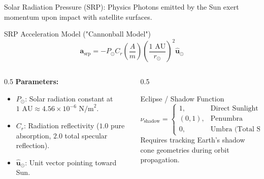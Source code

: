 \documentclass[aspectratio=169,11pt]{beamer}
\begin{document}
\begin{frame}{Solar Radiation Pressure (SRP): Physics}
    Photons emitted by the Sun exert momentum upon impact with satellite surfaces.

    \begin{block}{SRP Acceleration Model ("Cannonball Model")}
        $$\mathbf{a}_{\text{srp}} = - P_{\odot} C_r \left(\frac{A}{m}\right) \left(\frac{1 \text{ AU}}{r_{\odot}}\right)^2 \hat{\mathbf{u}}_{\odot}$$
    \end{block}

    \begin{columns}
        \begin{column}{0.5\textwidth}
            \textbf{Parameters:}
            \begin{itemize}
                \item $P_{\odot}$: Solar radiation constant at $1\text{ AU} \approx 4.56 \times 10^{-6}\text{ N/m}^2$.
                \item $C_r$: Radiation reflectivity ($1.0$ pure absorption, $2.0$ total specular reflection).
                \item $\hat{\mathbf{u}}_{\odot}$: Unit vector pointing toward Sun.
            \end{itemize}
        \end{column}
        
        \begin{column}{0.5\textwidth}
            \begin{block}{Eclipse / Shadow Function}
                $$\nu_{\text{shadow}} = \begin{cases} 
                    1, & \text{Direct Sunlight} \\
                    (0, 1), & \text{Penumbra} \\
                    0, & \text{Umbra (Total Shadow)}
                \end{cases}$$
                Requires tracking Earth's shadow cone geometries during orbit propagation.
            \end{block}
        \end{column}
    \end{columns}
\end{frame}
\end{document}
